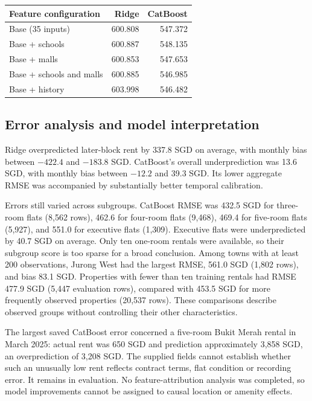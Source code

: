 \documentclass[conference]{IEEEtran}
\makeatletter
\newenvironment{localtable}{\par\addvspace{\medskipamount}\noindent
  \begin{minipage}{\columnwidth}\def\@captype{table}}{\end{minipage}\par
  \addvspace{\medskipamount}}
\makeatother
\begin{document}
\begin{localtable}
  \caption{Earlier-fold mean RMSE (SGD) at fixed selected parameters.
  CatBoost uses depth 8, learning rate 0.05, regularisation 3; Ridge uses
  $\alpha=10$. Each addition is separate.}
  \label{tab:ablation}
  \centering\small
  \begin{tabularx}{\columnwidth}{Xrr}
    \toprule
    Feature configuration & Ridge & CatBoost \\
    \midrule
    Base (35 inputs) & 600.808 & 547.372 \\
    Base + schools & 600.887 & 548.135 \\
    Base + malls & 600.853 & 547.653 \\
    Base + schools and malls & 600.885 & 546.985 \\
    Base + history & 603.998 & 546.482 \\
    \bottomrule
  \end{tabularx}
\end{localtable}

\subsection{Error analysis and model interpretation}
Ridge overpredicted later-block rent by 337.8 SGD on average, with monthly
bias between $-422.4$ and $-183.8$ SGD. CatBoost's overall underprediction
was 13.6 SGD, with monthly bias between $-12.2$ and 39.3 SGD. Its lower aggregate RMSE was accompanied by substantially better temporal
calibration.

Errors still varied across subgroups. CatBoost RMSE was 432.5 SGD for
three-room flats (8,562 rows), 462.6 for four-room flats (9,468), 469.4 for
five-room flats (5,927), and 551.0 for executive flats (1,309). Executive
flats were underpredicted by 40.7 SGD on average. Only ten one-room rentals
were available, so their subgroup score is too sparse for a broad conclusion.
Among towns with at least 200 observations, Jurong West had the largest
RMSE, 561.0 SGD (1,802 rows), and bias 83.1 SGD. Properties with fewer than
ten training rentals had RMSE 477.9 SGD (5,447 evaluation rows), compared
with 453.5 SGD for more frequently observed properties (20,537 rows).
These comparisons describe observed groups without controlling their other
characteristics.

The largest saved CatBoost error concerned a five-room Bukit Merah rental
in March 2025: actual rent was 650 SGD and prediction approximately 3,858
SGD, an overprediction of 3,208 SGD. The supplied fields cannot establish
whether such an unusually low rent reflects contract terms, flat condition
or recording error. It remains in evaluation. No feature-attribution
analysis was completed, so model improvements cannot be assigned to causal
location or amenity effects.
\end{document}
